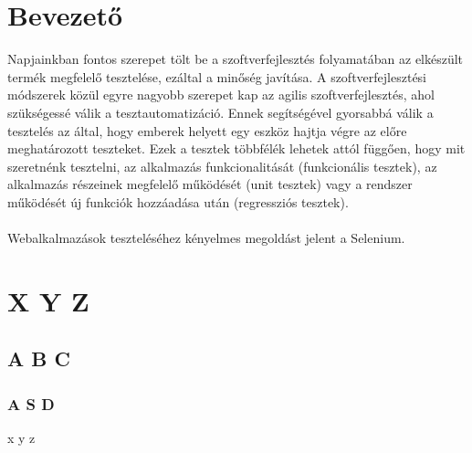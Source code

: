 \documentclass[a4paper, 12pt]{msc-style}
\begin{document}

\cleardoublepage
\tableofcontents
\thispagestyle{empty}
\cleardoublepage

\chapter{Bevezető}
Napjainkban fontos szerepet tölt be a szoftverfejlesztés folyamatában az elkészült
termék megfelelő tesztelése, ezáltal a minőség javítása.
A szoftverfejlesztési módszerek közül egyre nagyobb szerepet kap az agilis szoftverfejlesztés, ahol szükségessé válik a tesztautomatizáció. 
Ennek segítségével gyorsabbá válik a tesztelés az által, hogy emberek helyett egy eszköz hajtja végre az előre meghatározott teszteket.
Ezek a tesztek többfélék lehetek attól függően, hogy mit szeretnénk tesztelni, az alkalmazás funkcionalitását (funkcionális tesztek), 
az alkalmazás részeinek megfelelő működését (unit tesztek) vagy a rendszer működését új funkciók hozzáadása után (regressziós tesztek).\\\\
Webalkalmazások teszteléséhez kényelmes megoldást jelent a Selenium\cite{Selenium}.

\chapter{X Y Z}

\section{A B C}

\subsection{A S D}

x y z

\cleardoublepage
{
  \singlespacing
  
  
}

\end{document}
